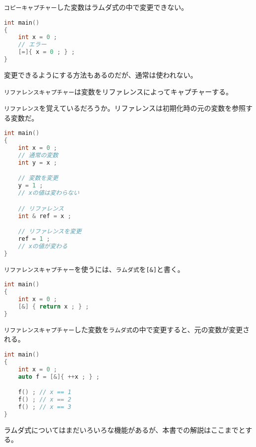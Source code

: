 \texttt{コピーキャプチャー}した変数はラムダ式の中で変更できない。

\begin{lstlisting}[language={C++}]
int main()
{
    int x = 0 ;
    // エラー
    [=]{ x = 0 ; } ;
}
\end{lstlisting}

変更できるようにする方法もあるのだが、通常は使われない。


\texttt{リファレンスキャプチャー}は変数をリファレンスによってキャプチャーする。

\texttt{リファレンス}を覚えているだろうか。リファレンスは初期化時の元の変数を参照する変数だ。

\begin{lstlisting}[language={C++}]
int main()
{
    int x = 0 ;
    // 通常の変数
    int y = x ;

    // 変数を変更
    y = 1 ;
    // xの値は変わらない

    // リファレンス
    int & ref = x ;

    // リファレンスを変更
    ref = 1 ;
    // xの値が変わる
}
\end{lstlisting}

\texttt{リファレンスキャプチャー}を使うには、\texttt{ラムダ式}を\texttt{[\&]}と書く。

\begin{lstlisting}[language={C++}]
int main()
{
    int x = 0 ;
    [&] { return x ; } ;
}
\end{lstlisting}

\texttt{リファレンスキャプチャー}した変数を\texttt{ラムダ式}の中で変更すると、元の変数が変更される。

\begin{lstlisting}[language={C++}]
int main()
{
    int x = 0 ;
    auto f = [&]{ ++x ; } ;

    f() ; // x == 1
    f() ; // x == 2
    f() ; // x == 3
}
\end{lstlisting}

ラムダ式についてはまだいろいろな機能があるが、本書での解説はここまでとする。
